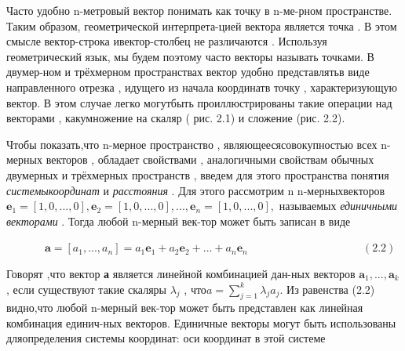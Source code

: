 \documentclass[10pt]{article}
\begin{document}
 Часто удобно n-метровый вектор понимать как точку в n-ме-\linebreak рном пространстве. Таким образом, геометрической интерпрета-\linebreak цией вектора является точка . В этом смысле вектор-строка и\linebreak вектор-столбец не различаются . Используя геометрический язык,\linebreak    
 мы будем поэтому часто векторы называть точками. В двумер-\linebreak ном и трёхмерном пространствах вектор удобно представлять\linebreak в виде направленного отрезка , идущего из начала координат\linebreak в точку , характеризующую вектор. В этом случае легко могут\linebreak быть проиллюстрированы такие операции над векторами , как\linebreak умножение на скаляр ( рис. 2.1) и сложение (рис. 2.2).

\begin{figure}[h]
\end{figure} 
 \vspace{-3mm}
\par\medskip Чтобы показать,что n-мерное пространство , являющееся\linebreak совокупностью всех n-мерных векторов , обладает свойствами \linebreak , аналогичными свойствам обычных двумерных и трёхмерных \linebreak пространств , введем для этого пространства понятия {\it системы\linebreak координат} и {\it расстояния} . Для этого рассмотрим n n-мерных\linebreak векторов\linebreak
$ \textbf{e}_1=[1,0,...,0], \textbf{e}_2=[1,0,...,0],..., \textbf{e}_n=[1,0,...,0],$
\linebreak
называемых {\it единичными векторами} . Тогда любой n-мерный век-\linebreak тор может быть записан в виде

 $\mspace{63mu} \textbf{a}=[a_1,...,a_n]=a_1\textbf{e}_1+a_2\textbf{e}_2+...+a_n\textbf{e}_n$ $\mspace{182mu } (2.2)$
\vspace{-6mm}
 \noindent 
     \par\medskip     Говорят ,что вектор \textbf{а} является линейной комбинацией дан-\linebreak ных векторов $ \textbf{a}_1,...,\textbf{a}_k $, если существуют такие скаляры $\lambda_j$ , что\linebreak $a=\sum\limits_{j=1}^k \lambda_j a_j$. Из равенства (2.2) видно,что любой n-мерный век-\linebreak тор может быть представлен как линейная комбинация единич-\linebreak ных векторов. Единичные векторы могут быть использованы для\linebreak определения системы координат: оси координат в этой системе 
 
\end{document}

